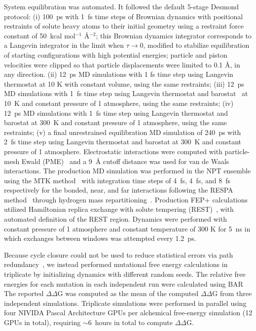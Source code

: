 \documentclass[phd,tocprelim]{cornell}
\begin{document}
System equilibration was automated.
It followed the default 5-stage Desmond protocol: 
(i) 100~ps with 1~fs time steps of Brownian dynamics with positional restraints of solute heavy atoms to their initial geometry using a restraint force constant of 50~kcal mol$^{-1}$ {\AA}$^{-2}$; 
this Brownian dynamics integrator corresponds to a Langevin integrator in the limit when $\tau\rightarrow$0, modified to stabilize equilibration of starting configurations with high potential energies; particle and piston velocities were clipped so that particle displacements were limited to 0.1 {\AA}, in any direction.
(ii) 12~ps MD simulations with 1 fs time step using Langevin thermostat at 10 K with constant volume, using the same restraints; 
(iii) 12~ps MD simulations with 1~fs time step using Langevin thermostat and barostat~\citep{langevin-piston} at 10~K and constant pressure of 1 atmosphere, using the same restraints; 
(iv) 12~ps MD simulations with 1~fs time step using Langevin thermostat and barostat at 300~K and constant pressure of 1 atmosphere, using the same restraints; 
(v) a final unrestrained equilibration MD simulation of 240~ps with 2~fs time step using Langevin thermostat and barostat at 300~K and constant pressure of 1 atmosphere.
Electrostatic interactions were computed with particle-mesh Ewald (PME)~\citep{pme} and a 9~{\AA} cutoff distance was used for van de Waals interactions.
The production MD simulation was performed in the NPT ensemble using the MTK method~\citep{mtk} with integration time steps of 4~fs, 4~fs, and 8~fs respectively for the bonded, near, and far interactions following the RESPA method~\citep{respa} through hydrogen mass repartitioning~\citep{hmr}.
Production FEP+ calculations utilized Hamiltonian replica exchange with solute tempering (REST)~\citep{Wang:Proc.Natl.Acad.Sci.:2012}, with automated definition of the REST region. 
Dynamics were performed with constant pressure of 1 atmosphere and constant temperature of 300 K for 5~ns in which exchanges between windows was attempted every 1.2~ps. 

Because cycle closure could not be used to reduce statistical errors via path redundancy~\citep{Wang:Proc.Natl.Acad.Sci.:2012}, we instead performed mutational free energy calculations in triplicate by initializing dynamics with different random seeds. 
The relative free energies for each mutation in each independent run were calculated using BAR~\citep{Bennett:J.Comput.Phys.:1976,Shirts:Phys.Rev.Lett.:2003}
The reported $\Delta\Delta$G was computed as the mean of the computed $\Delta\Delta$G from three independent simulations.
Triplicate simulations were performed in parallel using four NIVIDA Pascal Architecture GPUs per alchemical free-energy simulation (12 GPUs in total), requiring $\sim$6~hours in total to compute $\Delta\Delta$G.    
\end{document}
